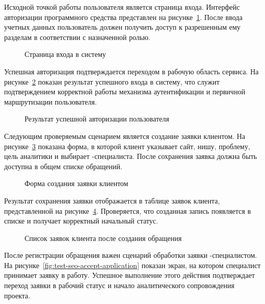 Исходной точкой работы пользователя является страница входа. Интерфейс авторизации программного средства представлен на рисунке~\ref{fig:test-login-page}. После ввода учетных данных пользователь должен получить доступ к разрешенным ему разделам в соответствии с назначенной ролью.

\begin{figure}[H]
    \centering
    \caption{Страница входа в систему}
    \label{fig:test-login-page}
\end{figure}

Успешная авторизация подтверждается переходом в рабочую область сервиса. На рисунке~\ref{fig:test-login-success} показан результат успешного входа в систему, что служит подтверждением корректной работы механизма аутентификации и первичной маршрутизации пользователя.

\begin{figure}[H]
    \centering
    \caption{Результат успешной авторизации пользователя}
    \label{fig:test-login-success}
\end{figure}

Следующим проверяемым сценарием является создание заявки клиентом. На рисунке~\ref{fig:test-client-create-application} показана форма, в которой клиент указывает сайт, нишу, проблему, цель аналитики и выбирает -специалиста. После сохранения заявка должна быть доступна в общем списке обращений.

\begin{figure}[H]
    \centering
    \caption{Форма создания заявки клиентом}
    \label{fig:test-client-create-application}
\end{figure}

Результат сохранения заявки отображается в таблице заявок клиента, представленной на рисунке~\ref{fig:test-client-application-list}. Проверяется, что созданная запись появляется в списке и получает корректный начальный статус.

\begin{figure}[H]
    \centering
    \caption{Список заявок клиента после создания обращения}
    \label{fig:test-client-application-list}
\end{figure}

После регистрации обращения важен сценарий обработки заявки -специалистом. На рисунке~\ref{fig:test-seo-accept-application} показан экран, на котором специалист принимает заявку в работу. Успешное выполнение этого действия подтверждает переход заявки в рабочий статус и начало аналитического сопровождения проекта.

